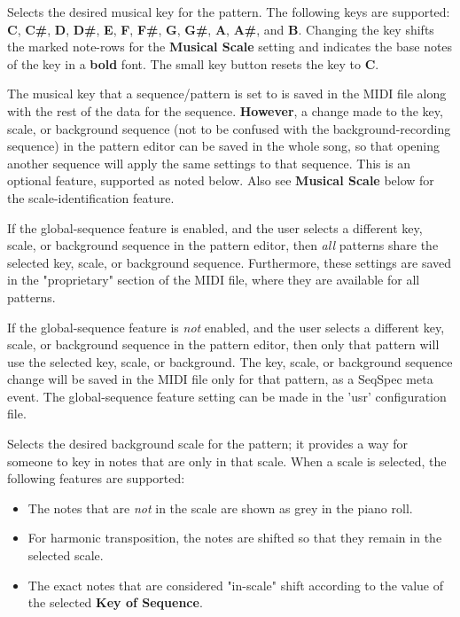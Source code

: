    Selects the desired musical key for the pattern.  The following keys are
   supported:
   \textbf{C}, \textbf{C\#},
   \textbf{D}, \textbf{D\#},
   \textbf{E}, \textbf{F}, \textbf{F\#},
   \textbf{G}, \textbf{G\#},
   \textbf{A}, \textbf{A\#},
   and \textbf{B}.
   Changing the key shifts the marked note-rows
   for the \textbf{Musical Scale} setting and indicates the base notes
   of the key in a \textbf{bold} font.
   The small key button resets the key to \textbf{C}.

   The musical key that a sequence/pattern is set to is
   saved in the MIDI file along with the rest of the data for the sequence.
   \textbf{However},
   a change made to the key, scale,
   or background sequence (not to be confused with the background-recording
   sequence) in the pattern editor can be saved in the whole song,
   so that opening another sequence
   will apply the same settings to that sequence.  This is an optional feature,
   supported as noted below.
   Also see \textbf{Musical Scale} below for the scale-identification feature.

   If the global-sequence feature is enabled, and the user selects
   a different key, scale, or background sequence in the pattern editor, 
   then \textsl{all} patterns share the selected key, scale, or background
   sequence.  Furthermore, these settings are saved in the "proprietary"
   section of the MIDI file, where they are available for all patterns.

   If the global-sequence feature is \textsl{not} enabled, and the user selects
   a different key, scale, or background sequence in the pattern editor, 
   then only that pattern will use the selected key, scale, or background.
   The key, scale, or background sequence change will be saved in the MIDI file
   only for that pattern, as a SeqSpec meta event.
   The global-sequence feature setting can be made in the 'usr' configuration
   file.

   Selects the desired background scale for the pattern; it provides a way for
   someone to key in notes that are only in that scale.
   When a scale is selected, the following features are supported:

   \begin{itemize}
      \item The notes that are \textsl{not}
         in the scale are shown as grey in the piano roll.
      \item For harmonic transposition, the notes are shifted
         so that they remain in the selected scale.
      \item The exact notes that are considered "in-scale" shift according
         to the value of the selected \textbf{Key of Sequence}.
   \end{itemize}

